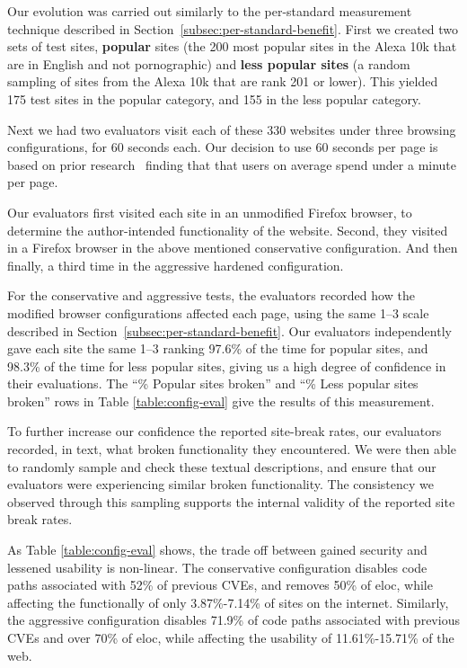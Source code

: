 Our evolution was carried out similarly to the per-standard measurement
technique described in Section~\ref{subsec:per-standard-benefit}.  First
we created two sets of test sites, \textbf{popular} sites (the 200 most popular
sites in the Alexa 10k that are in English and not pornographic) and
\textbf{less popular sites} (a random sampling of sites from the Alexa 10k that
are rank 201 or lower).  This yielded 175 test sites in the popular category,
and 155 in the less popular category.

Next we had two evaluators visit each of these 330 websites under three browsing
configurations, for 60 seconds each.  Our decision to use 60 seconds per page
is based on prior research~\cite{liu2010understanding} finding that
that users on average spend under a minute per page.

Our evaluators first visited each site in an unmodified
Firefox browser, to determine the author-intended functionality of the website.
Second, they visited in a Firefox browser in the above mentioned conservative
configuration.  And then finally, a third time in the aggressive hardened
configuration.

For the conservative and aggressive tests, the evaluators recorded how the
modified browser configurations affected each page, using the same 1--3 scale
described in Section~\ref{subsec:per-standard-benefit}.  Our evaluators
independently gave each site the same 1--3 ranking 97.6\% of the time for
popular sites, and 98.3\% of the time for less popular sites, giving us
a high degree of confidence in their evaluations.  The ``\% Popular sites
broken'' and ``\% Less popular sites broken'' rows in Table
\ref{table:config-eval} give the results of this measurement.

To further increase our confidence the reported site-break rates, our evaluators
recorded, in text, what broken functionality they encountered.  We were then
able to randomly sample and check these textual
descriptions, and ensure that our evaluators were experiencing similar broken
functionality.  The consistency we observed through this sampling supports
the internal validity of the reported site break rates.

As Table \ref{table:config-eval} shows, the trade off between gained security
and lessened usability is non-linear.  The conservative configuration disables
code paths associated with 52\% of previous CVEs, and removes 50\% of
\gls{eloc}, while affecting the functionally of
only 3.87\%-7.14\% of sites on the internet.  Similarly, the aggressive
configuration disables 71.9\% of code paths associated with previous CVEs and
over 70\% of \gls{eloc}, while affecting the usability
of 11.61\%-15.71\% of the web.


